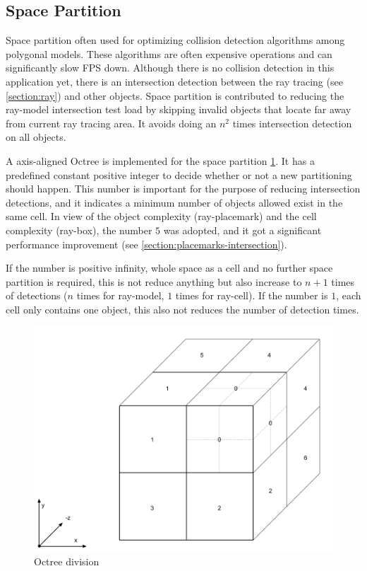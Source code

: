 \subsection{Space Partition} 
\label{section:space-partition}

Space partition often used for optimizing collision detection algorithms among polygonal models. These algorithms are often expensive operations and can significantly slow FPS down. Although there is no collision detection in this application yet, there is an intersection detection between the ray tracing (see \ref{section:ray}) and other objects. Space partition is contributed to reducing the ray-model intersection test load by skipping invalid objects that locate far away from current ray tracing area. It avoids doing an $n^2$ times intersection detection on all objects.

A axis-aligned Octree is implemented for the space partition \ref{fig:octree-division}. It has a predefined constant positive integer to decide whether or not a new partitioning should happen. This number is important for the purpose of reducing intersection detections, and it indicates a minimum number of objects allowed exist in the same cell. In view of the object complexity (ray-placemark) and the cell complexity (ray-box), the number $5$ was adopted, and it got a significant performance improvement (see \ref{section:placemarks-intersection}).

If the number is positive infinity, whole space as a cell and no further space partition is required, this is not reduce anything but also increase to $n + 1$ times of detections ($n$ times for ray-model, $1$ times for ray-cell). If the number is $1$, each cell only contains one object, this also not reduces the number of detection times. 

\begin{figure}[H]
\caption{Octree division}
\label{fig:octree-division}
\centering
\includegraphics[width=\textwidth, keepaspectratio]{Figures/octree-division.png}
\decoRule
\end{figure}

